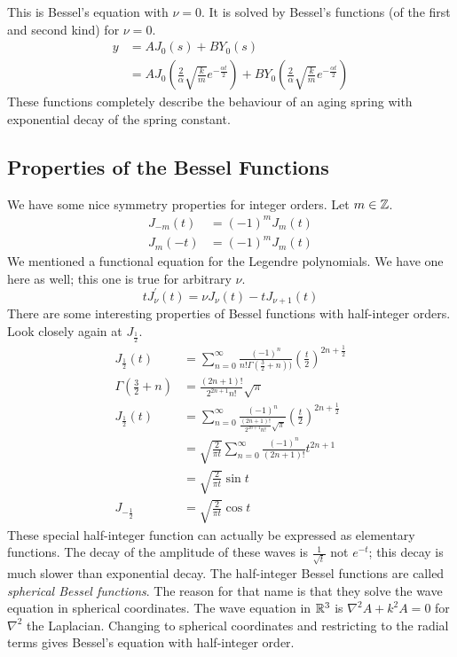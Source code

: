 \documentclass[fleqn,letterpaper]{report}
\begin{document}
This is Bessel's equation with $\nu = 0$. It is
solved by Bessel's functions (of the first and second kind)
for $\nu = 0$.
\begin{align*}
y & = A J_0(s) + B Y_0(s) \\
& = A J_0 \left( \frac{2}{\alpha} \sqrt{\frac{k}{m}}
e^{-\frac{\alpha t}{2}} \right) + B Y_0 \left( \frac{2}{\alpha}
\sqrt{\frac{k}{m}} e^{-\frac{\alpha t}{2}} \right) 
\end{align*}
These functions completely describe the behaviour of an aging
spring with exponential decay of the spring constant.

\subsection{Properties of the Bessel Functions}
\label{bessel-functions-properties}

We have some nice symmetry properties for integer orders. Let
$m \in \mathbb{Z}$. 
\begin{align*}
J_{-m}(t) & = (-1)^m J_m(t) \\
J_m(-t) & = (-1)^m J_m(t) 
\end{align*}
We mentioned a functional equation for the Legendre
polynomials. We have one here as well; this one is true for
arbitrary $\nu$.
\begin{equation*}
tJ_{\nu}^\prime(t) = \nu J_{\nu}(t) - t J_{\nu+1}(t) 
\end{equation*}
There are some interesting properties of Bessel functions with
half-integer orders. Look closely again at $J_{\frac{1}{2}}$. 
\begin{align*}
J_{\frac{1}{2}}(t) & = \sum_{n=0}^\infty \frac{(-1)^n}{n!
\Gamma(\frac{3}{2} + n))} \left( \frac{t}{2} \right)^{2n +
\frac{1}{2}} \\
\Gamma \left( \frac{3}{2} + n \right) & =
\frac{(2n+1)!}{2^{2n+1} n!} \sqrt{\pi} \\
J_{\frac{1}{2}}(t) & = \sum_{n=0}^\infty \frac{(-1)^n}
{\frac{(2n+1)!}{2^{2n+1}n!} \sqrt{\pi}} \left( \frac{t}{2}
\right)^{2n + \frac{1}{2}} \\
& = \sqrt{\frac{2}{\pi t}} \sum_{n=0}^\infty
\frac{(-1)^n}{(2n+1)!} t^{2n+1} \\
& = \sqrt{\frac{2}{\pi t}} \sin t \\
J_{-\frac{1}{2}} & = \sqrt{\frac{2}{\pi t}} \cos t
\end{align*}
These special half-integer function can actually be expressed
as elementary functions. The decay of the amplitude of these
waves is $\frac{1}{\sqrt{t}}$ not $e^{-t}$; this decay is
much slower than exponential decay. The half-integer Bessel
functions are called \emph{spherical Bessel functions}. The
reason for that name is that they solve the wave equation in
spherical coordinates. The wave equation in $\mathbb{R}^3$ is
$\nabla^2 A + k^2 A = 0$ for $\nabla^2$ the Laplacian.
Changing to spherical coordinates and restricting to the
radial terms gives Bessel's equation with half-integer order.
\end{document}
